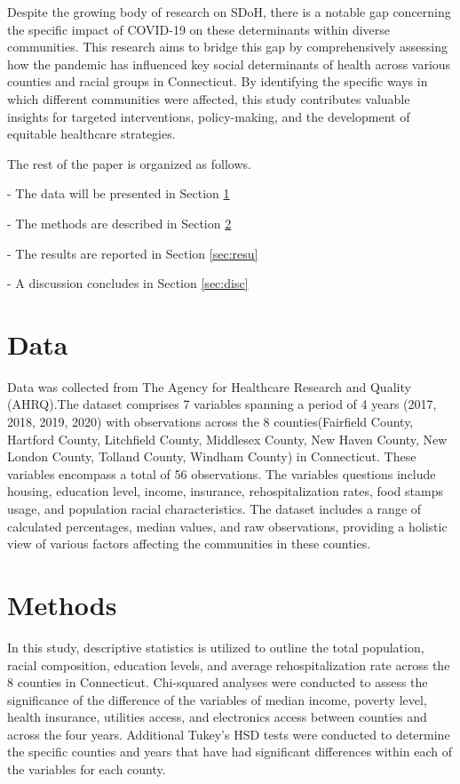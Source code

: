 \documentclass[12pt]{article}
\begin{document}
Despite the growing body of research on SDoH, there is a notable gap concerning the specific impact of COVID-19 on 
these determinants within diverse communities. This research aims to bridge this gap by comprehensively assessing how 
the pandemic has influenced key social determinants of health across various counties and racial groups in Connecticut. 
By identifying the specific ways in which different communities were affected, this study contributes valuable insights 
for targeted interventions, policy-making, and the development of equitable healthcare strategies.


The rest of the paper is organized as follows.

- The data will be presented in Section \ref{sec:data}

- The methods are described in Section \ref{sec:meth}

- The results are reported in Section \ref{sec:resu}

- A discussion concludes in Section \ref{sec:disc}

\section{Data}\label{sec:data}

Data was collected from The Agency for Healthcare Research and Quality (AHRQ).The dataset comprises 7 variables 
spanning a period of 4 years (2017, 2018, 2019, 2020) with observations across the 8 counties(Fairfield County, Hartford County, 
Litchfield County, Middlesex County, New Haven County, New London County, Tolland County, Windham County) in Connecticut. These variables 
encompass a total of 56 observations. The variables questions include housing, education level, income, insurance,
rehospitalization rates, food stamps usage, and population racial characteristics. The dataset includes a range of 
calculated percentages, median values, and raw observations, providing a holistic view of various factors affecting 
the communities in these counties. 

\section{Methods}\label{sec:meth}

In this study, descriptive statistics is utilized to outline the total population, racial composition, 
education levels, and average rehospitalization rate across the 8 counties in Connecticut. Chi-squared analyses were 
conducted to assess the significance of the difference of the variables of median income, poverty level, health insurance, 
utilities access, and electronics access between counties and across the four years. Additional 
Tukey's HSD tests were conducted to determine the specific counties and years that have had significant differences within 
each of the variables for each county.
\end{document}

